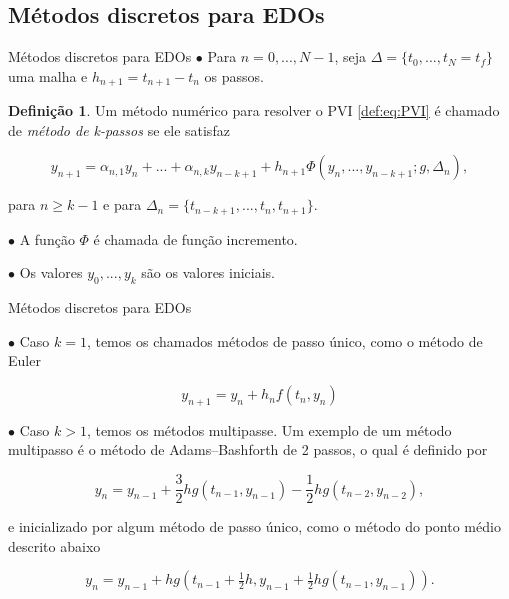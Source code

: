 \documentclass{beamer}
\theoremstyle{plain}
\theoremstyle{definition}
\newtheorem{defi}{Definição}
\begin{document}


\subsection{Métodos discretos para EDOs}


\begin{frame}{Métodos discretos para EDOs}
    \small
    \phantom{aa} $\bullet$ Para $n = 0, ..., N-1$, seja $\Delta = \{ t_0, ..., t_N = t_f\}$ uma malha e $h_{n+1} = t_{n+1} - t_n$ os passos.

    \begin{defi}
        Um método numérico para resolver o PVI \eqref{def:eq:PVI} é chamado de \textit{método de k-passos} se ele satisfaz 

        \begin{equation}
            y_{n+1} = \alpha_{n, 1} y_n + ... + \alpha_{n, k} y_{n - k + 1} + h_{n+1} \Phi( y_n, ..., y_{n-k+1}; g, \Delta_n), 
            \label{chap3:def:eq:ODE_method}
        \end{equation}

        para $n \geq k - 1$ e para $\Delta_n = \{ t_{n - k + 1}, ..., t_n, t_{n+1}\} $.

    \end{defi}

    \phantom{aa} $\bullet$ A função $\Phi$ é chamada de função incremento.

    \phantom{aa} $\bullet$ Os valores $y_0, ..., y_k$ são os valores iniciais.



\end{frame}


\begin{frame}{Métodos discretos para EDOs}

    \small

    \phantom{aa} $\bullet$ Caso $k = 1$, temos os chamados métodos de passo único, como o método de Euler 

    \[
        y_{n+1} = y_n + h_n f(t_n, y_n)
    \]

    \phantom{aa} $\bullet$ Caso $k > 1$, temos os métodos multipasse. Um exemplo de um método multipasso é o método de Adams–Bashforth de 2 passos, o qual é definido por 

    \[
        y_{n} = y_{n-1} + \frac{3}{2} h g(t_{n-1},y_{n-1}) - \frac{1}{2} hg(t_{n-2},y_{n-2}),
    \]

    \noindent
    e  inicializado por algum método de passo único, como o método do ponto médio descrito abaixo

    \[
        y_{n}=y_{n-1}+hg\left(t_{n-1}+{\tfrac {1}{2}}h,y_{n-1}+{\tfrac {1}{2}}hg(t_{n-1},y_{n-1})\right).
    \]
\end{frame}
\end{document}
